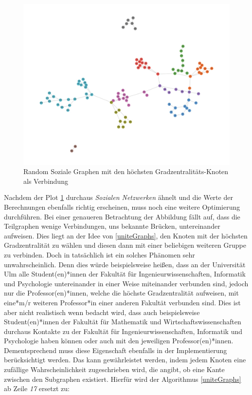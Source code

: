 \FloatBarrier
\begin{figure}[h!]
    \centering
    \hspace*{-1.5cm}
    \includegraphics[width=1.0\textwidth]{Graphics/NearSocialNetwork.jpg}
    \caption{Random Soziale Graphen mit den höchsten Gradzentralitäts-Knoten als Verbindung }
    \label{NearSozialerGraph}
\end{figure}

\newpage
Nachdem der Plot \ref{NearSozialerGraph} durchaus \textit{Sozialen Netzwerken} ähnelt und die Werte der Berechnungen ebenfalls richtig erscheinen, muss noch eine weitere Optimierung durchführen. Bei einer genaueren Betrachtung der Abbildung fällt auf, dass die Teilgraphen wenige Verbindungen, uns bekannte Brücken, untereinander aufweisen. Dies liegt an der Idee von \ref{uniteGraphs}, den Knoten mit der höchsten Gradzentralität zu wählen und diesen dann mit einer beliebigen weiteren Gruppe zu verbinden. Doch in tatsächlich ist ein solches Phänomen sehr unwahrscheinlich. Denn dies würde beispielsweise heißen, dass an der Universität Ulm alle Student(en)*innen der Fakultät für Ingenieurwissenschaften, Informatik und Psychologie untereinander in einer Weise miteinander verbunden sind, jedoch nur die Professor(en)*innen, welche die höchste Gradzentralität aufweisen, mit eine*m/r weiteren Professor*in einer anderen Fakultät verbunden sind. Dies ist aber nicht realistisch wenn bedacht wird, dass auch beispielsweise Student(en)*innen der Fakultät für Mathematik und Wirtschaftswissenschaften durchaus Kontakte zu der Fakultät für Ingenieurwissenschaften, Informatik und Psychologie haben können oder auch mit den jeweiligen Professor(en)*innen. Dementsprechend muss diese Eigenschaft ebenfalls in der Implementierung berücksichtigt werden. Das kann gewährleistet werden, indem jedem Knoten eine zufällige Wahrscheinlichkeit zugeschrieben wird, die angibt, ob eine Kante zwischen den Subgraphen existiert. Hierfür wird der Algorithmus \ref{uniteGraphs} ab Zeile \textit{17} ersetzt zu:

